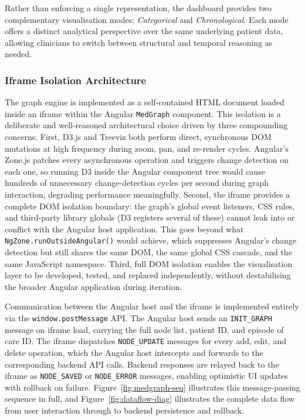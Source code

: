 Rather than enforcing a single representation, the dashboard provides two
complementary visualisation modes: \textit{Categorical} and
\textit{Chronological}. Each mode offers a distinct analytical perspective over
the same underlying patient data, allowing clinicians to switch between
structural and temporal reasoning as needed.

\subsubsection{Iframe Isolation Architecture}

The graph engine is implemented as a self-contained HTML document loaded inside
an iframe within the Angular \texttt{MedGraph} component. This isolation is a
deliberate and well-reasoned architectural choice driven by three compounding
concerns. First, D3.js and Treeviz both perform direct, synchronous DOM
mutations at high frequency during zoom, pan, and re-render cycles. Angular's
Zone.js patches every asynchronous operation and triggers change detection on
each one, so running D3 inside the Angular component tree would cause hundreds
of unnecessary change-detection cycles per second during graph interaction,
degrading performance meaningfully. Second, the iframe provides a complete DOM
isolation boundary: the graph's global event listeners, CSS rules, and
third-party library globals (D3 registers several of these) cannot leak into
or conflict with the Angular host application. This goes beyond what
\texttt{NgZone.runOutsideAngular()} would achieve, which suppresses Angular's
change detection but still shares the same DOM, the same global CSS cascade,
and the same JavaScript namespace. Third, full DOM isolation enables the
visualisation layer to be developed, tested, and replaced independently,
without destabilising the broader Angular application during iteration.

Communication between the Angular host and the iframe is implemented entirely
via the \texttt{window.postMessage} API. The Angular host sends an
\texttt{INIT\_GRAPH} message on iframe load, carrying the full node list,
patient ID, and episode of care ID. The iframe dispatches
\texttt{NODE\_UPDATE} messages for every add, edit, and delete operation,
which the Angular host intercepts and forwards to the corresponding backend
API calls. Backend responses are relayed back to the iframe as
\texttt{NODE\_SAVED} or \texttt{NODE\_ERROR} messages, enabling optimistic
UI updates with rollback on failure. Figure~\ref{fig:medgraph-seq} illustrates
this message-passing sequence in full, and Figure~\ref{fig:dataflow-diag}
illustrates the complete data flow from user interaction through to backend
persistence and rollback.


